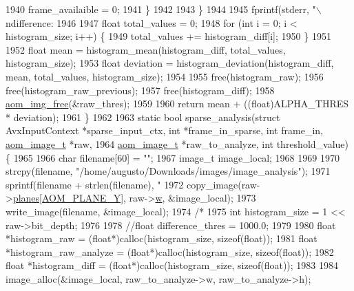 \begin{DoxyCodeInclude}
{{{{{{{{{{{{{{{{{{{{{{{{{{{{{{{{{{{{{{{{{{{{{{1940       frame\_availaible = 0;
1941     \}
1942 
1943   \}
1944 
1945   fprintf(stderr, \textcolor{stringliteral}{"\(\backslash\)ndifference: %
1946 
1947   \textcolor{keywordtype}{float} total\_values = 0;
1948   \textcolor{keywordflow}{for} (\textcolor{keywordtype}{int} i = 0; i < histogram\_size; i++) \{
1949     total\_values += histogram\_diff[i];
1950   \}
1951 
1952   \textcolor{keywordtype}{float} mean = histogram\_mean(histogram\_diff, total\_values, histogram\_size);
1953   \textcolor{keywordtype}{float} deviation = histogram\_deviation(histogram\_diff, mean, total\_values, histogram\_size);
1954 
1955   free(histogram\_raw);
1956   free(histogram\_raw\_previous);
1957   free(histogram\_diff);
1958   \hyperlink{aom__image_8h_afff22f7f3eb9409c5b678d1962f110a8}{aom\_img\_free}(&raw\_thres);
1959 
1960   \textcolor{keywordflow}{return} mean + ((float)ALPHA\_THRES * deviation);
1961 \}
1962 
1963 \textcolor{keyword}{static} \textcolor{keywordtype}{bool} sparse\_analysis(\textcolor{keyword}{struct} AvxInputContext *sparse\_input\_ctx, \textcolor{keywordtype}{int} *frame\_in\_sparse, \textcolor{keywordtype}{int} frame\_in, 
      \hyperlink{structaom__image}{aom\_image\_t} *raw,
1964     \hyperlink{structaom__image}{aom\_image\_t} *raw\_to\_analyze, \textcolor{keywordtype}{int} threshold\_value) \{
1965 
1966   \textcolor{keywordtype}{char} filename[60] = \textcolor{stringliteral}{""};
1967   image\_t image\_local;
1968 
1969 
1970   strcpy(filename, \textcolor{stringliteral}{"/home/augusto/Downloads/images/image\_analysis"});
1971   sprintf(filename + strlen(filename), \textcolor{stringliteral}{"%
1972   copy\_image(raw->\hyperlink{structaom__image_ac54dbc5237ca2914f9ec30105dfbe302}{planes}[\hyperlink{aom__image_8h_a2ad22076006b15cf809edcaa33f6d339}{AOM\_PLANE\_Y}], raw->\hyperlink{structaom__image_a695141e492ab146dc15e8131827eb237}{w}, &image\_local);
1973   write\_image(filename, &image\_local);
1974   \textcolor{comment}{/*}
1975 \textcolor{comment}{  int histogram\_size = 1 << raw->bit\_depth;}
1976 \textcolor{comment}{}
1978 \textcolor{comment}{  //float difference\_thres = 1000.0;}
1979 \textcolor{comment}{}
1980 \textcolor{comment}{  float *histogram\_raw = (float*)calloc(histogram\_size, sizeof(float));}
1981 \textcolor{comment}{  float *histogram\_raw\_analyze = (float*)calloc(histogram\_size, sizeof(float));}
1982 \textcolor{comment}{  float *histogram\_diff = (float*)calloc(histogram\_size, sizeof(float));}
1983 \textcolor{comment}{}
1984 \textcolor{comment}{  image\_alloc(&image\_local, raw\_to\_analyze->w, raw\_to\_analyze->h);}
}}}}}}}}}}}}}}}}}}}}}}}}}}}}}}}}}}}}}}}}}}}}}}}}
\end{DoxyCodeInclude}
